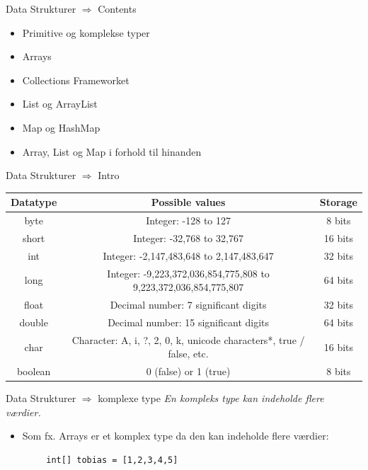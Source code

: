 \documentclass[10pt,aspectratio=1610]{beamer}
\begin{document}
\begin{frame}{Data Strukturer $\Rightarrow$ Contents}
    \begin{itemize}
        \item Primitive og komplekse typer
        \item Arrays
        \item Collections Frameworket
        \item List og ArrayList
        \item Map og HashMap
        \item Array, List og Map i forhold til hinanden
    \end{itemize}
\end{frame}

\begin{frame}{Data Strukturer $\Rightarrow$ Intro}
   \begin{table}[h]
\centering
\begin{tabular}{|c|c|c|}
\hline
Datatype & Possible values & Storage \\ \hline
byte & Integer: -128 to 127 & 8 bits \\ \hline
short & Integer: -32,768 to 32,767 & 16 bits \\ \hline
int & Integer: -2,147,483,648 to 2,147,483,647 & 32 bits \\ \hline
long & Integer: -9,223,372,036,854,775,808 to 9,223,372,036,854,775,807 & 64 bits \\ \hline
float & Decimal number: 7 significant digits & 32 bits \\ \hline
double & Decimal number: 15 significant digits & 64 bits \\ \hline
char & Character: A, i, ?, 2, 0, k, unicode characters*, true / false, etc. & 16 bits \\ \hline
boolean & 0 (false) or 1 (true) & 8 bits \\ \hline
\end{tabular}

\end{table}

\end{frame}


\begin{frame}[fragile]{Data Strukturer $\Rightarrow$ komplexe type}
    \textit{En kompleks type kan indeholde flere værdier.}
    \begin{itemize}
        \item Som fx. Arrays er et komplex type da den kan indeholde flere værdier:
    \end{itemize}
    \begin{lstlisting}
        int[] tobias = [1,2,3,4,5]
    \end{lstlisting}
\end{frame}
\end{document}
